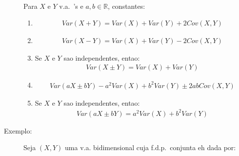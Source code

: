 \begin{description}
    Para $X$ e $Y$ v.a.\ 's e $a,b \in \mathbb{R}$, constantes:
    \begin{enumerate}
      \item 
       \begin{align*}
         Var(X+Y)= Var(X)+Var(Y) + 2 Cov(X,Y) 
       \end{align*} 
     \item 
       \begin{align*}
         Var(X-Y) = Var(X) + Var(Y) -2 Cov(X,Y)
       \end{align*}
     \item Se $X$ e $Y$ sao independentes, entao:
       \begin{align*}
         Var(X \pm Y) = Var(X) +Var(Y)
       \end{align*}
     \item 
       \begin{align*}
         Var(aX \pm bY) - a^2 Var(X)+ b^2 Var(Y) \pm 2ab Cov(X,Y)
       \end{align*}
     \item Se $X$ e $Y$ sao independentes, entao:
       \begin{align*}
         Var(aX \pm bY) = a^2 Var(X) + b^2Var(Y)
       \end{align*}
    \end{enumerate}
  \item [Exemplo:] Seja $(X,Y)$ uma v.a. bidimensional cuja f.d.p.\ conjunta eh dada por:
    \begin{description}
      

\end{description}
\end{description}
